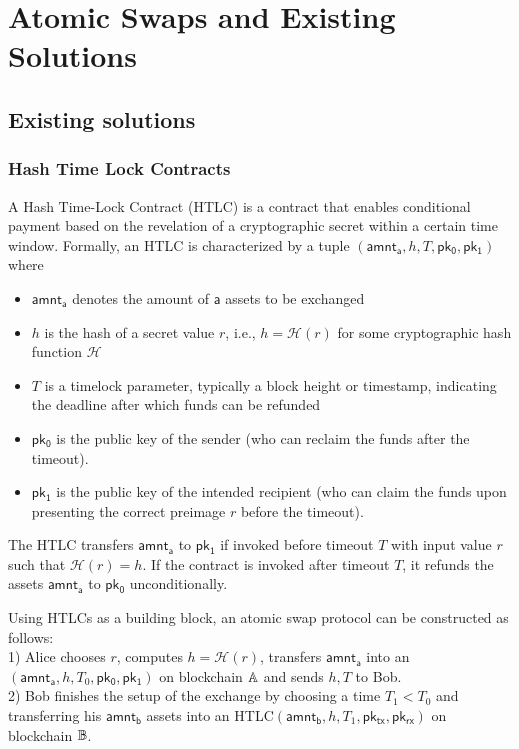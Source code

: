 
\section{Atomic Swaps and Existing Solutions}\label{sec:atomic_swap_overview}


\subsection{Existing solutions}

\subsubsection{Hash Time Lock Contracts}

A Hash Time-Lock Contract (HTLC) is a contract that enables conditional payment based on the revelation of a cryptographic secret within a certain time window. Formally, an HTLC is characterized by a tuple  $(\mathsf{amnt_a}, h, T, \mathsf{pk_0}, \mathsf{pk_1})$ where
\begin{itemize}
	\item $\mathsf{amnt_a}$ denotes the amount of $\mathsf{a}$ assets to be exchanged
	\item $h$ is the hash of a secret value $r$, i.e., $h = \mathcal{H}(r)$ for some cryptographic hash function $\mathcal{H}$
	\item $T$ is a timelock parameter, typically a block height or timestamp, indicating the deadline after which funds can be refunded
	\item $\mathsf{pk_0}$ is the public key of the sender (who can reclaim the funds after the timeout).
	\item $\mathsf{pk_1}$ is the public key of the intended recipient (who can claim the funds upon presenting the correct preimage $r$ before the timeout).
\end{itemize}

The HTLC transfers $\mathsf{amnt_a}$ to $\mathsf{pk_1}$ if invoked before timeout $T$ with input value $r$ such that $\mathcal{H}(r) = h$. 
If the contract is invoked after timeout $T$, it refunds the assets $\mathsf{amnt_a}$ to $\mathsf{pk_0}$ unconditionally.

Using HTLCs as a building block, an atomic swap protocol can be constructed as follows: \\
1) Alice chooses $r$, computes $h = \mathcal{H}(r)$, transfers $\mathsf{amnt_a}$ into an $(\mathsf{amnt_a}, h, T_0, \mathsf{pk_0}, \mathsf{pk_1})$ on blockchain $\mathbb{A}$ and sends $h,T$ to Bob. \\
2) Bob finishes the setup of the exchange by choosing a time $T_1 < T_0$ and transferring his $\mathsf{amnt_b}$ assets into an HTLC$(\mathsf{amnt_b}, h, T_1, \mathsf{pk_{tx}}, \mathsf{pk_{rx}})$ on blockchain $\mathbb{B}$.

